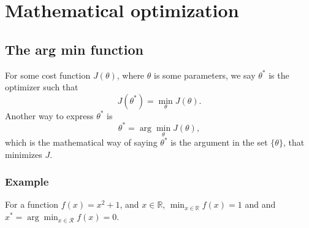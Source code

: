 \section{Mathematical optimization \label{appendix:optimization}}
\subsection{The arg min function}
For some cost function $J(\theta)$, where $\theta$ is some parameters, we say $\theta^*$ is the optimizer such that
\begin{equation}
	J(\theta^*) = \min_\theta J(\theta).
\end{equation}
Another way to express $\theta^*$ is
\begin{equation}
	\theta^* = \arg\min_\theta J(\theta),
\end{equation}
which is the mathematical way of saying $\theta^*$ is the argument in the set $\{\theta\}$, that minimizes $J$.
\subsubsection{Example}
For a function $f(x)=x^2+1$, and $x\in\mathbb{R}$, $\min_{x\in\mathbb{R}} f(x)=1$ and and $x^*=\arg\min_{x\in\mathcal{R}} f(x) = 0$.